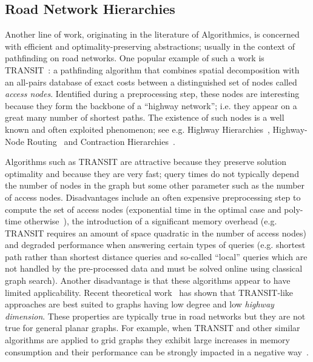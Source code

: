 \subsection{Road Network Hierarchies}
Another line of work, originating in the literature of Algorithmics, is
concerned with efficient and optimality-preserving abstractions; usually in
the context of pathfinding on road networks.  One popular example of such a
work is TRANSIT~\citep{bast06,bast07}: a pathfinding algorithm that combines
spatial decomposition with an all-pairs database of exact costs between a
distinguished set of nodes called \emph{access nodes}. Identified during a
preprocessing step, these nodes are interesting because they form the backbone
of a ``highway network''; i.e. they appear on a great many number of shortest paths.
The existence of such nodes is a well known and often exploited phenomenon;
see e.g. Highway Hierarchies~\citep{sanders05,sanders06}, Highway-Node
Routing~\citep{schultes07} and Contraction Hierarchies~\citep{geisberger08}.

Algorithms such as TRANSIT are attractive because they preserve solution 
optimality and because they are very
fast; query times do not typically depend the number of nodes in the graph but some 
other parameter such as the number of access nodes.
Disadvantages include an often expensive preprocessing
step to compute the set of access nodes (exponential time in the optimal case 
and poly-time otherwise~\cite{abrahamDFGW13}), the introduction of a 
significant memory overhead (e.g. TRANSIT requires an amount of space quadratic 
in the number of access nodes) and degraded performance when answering certain
types of queries (e.g. shortest path rather than shortest distance queries and
so-called ``local'' queries which are not handled by the pre-processed data and 
must be solved online using classical graph search).
Another disadvantage is that these algorithms appear to have limited applicability. 
Recent theoretical
work~\citep{abraham10,abrahamDFGW13} has shown that TRANSIT-like approaches are 
best suited to graphs having low degree and low \emph{highway dimension}.
These properties are typically true in road networks but they are not true for 
general planar graphs.  For example, when TRANSIT and other similar algorithms 
are applied to grid graphs they exhibit large increases in memory consumption 
and their performance can be strongly impacted in a negative way~\citep{antsfeld12}.
